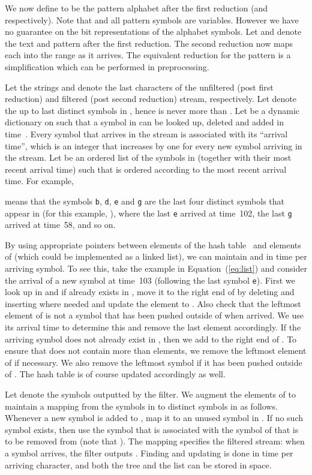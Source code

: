 \documentclass[11pt,a4paper]{article}
\theoremstyle{theorem}
\begin{document}
We now define  to be the pattern alphabet after the first reduction (and  respectively). Note that  and all pattern symbols are variables. However we have no guarantee on the bit representations of the alphabet symbols. Let  and  denote the text and pattern after the first reduction. The second reduction now maps each  into the range  as it arrives. The equivalent reduction for the pattern is a simplification which can be performed in preprocessing.

Let the strings  and  denote the last  characters of the unfiltered (post first reduction) and filtered (post second reduction) stream, respectively. Let  denote the up to  last distinct symbols in , hence  is never more than . Let  be a dynamic dictionary on  such that a symbol in  can be looked up, deleted and added in  time~\cite{AT:2000}. Every symbol that arrives in the stream is associated with its ``arrival time'', which is an integer that increases by one for every new symbol arriving in the stream. Let  be an ordered list of the symbols in  (together with their most recent arrival time) such that  is ordered according to the most recent arrival time. For example,

means that the symbols \texttt{b}, \texttt{d}, \texttt{e} and \texttt{g} are the last four distinct symbols that appear in  (for this example, ), where the last \texttt{e} arrived at time~102, the last \texttt{g} arrived at time~58, and so on.

    By using appropriate pointers between elements of the hash table~ and elements of  (which could be implemented as a linked list), we can maintain  and  in  time per arriving symbol. To see this, take the example in Equation~(\ref{eq:list}) and consider the arrival of a new symbol  at time~103 (following the last symbol \texttt{e}). First we look up  in  and if  already exists in , move it to the right end of  by deleting and inserting where needed and update the element to . Also check that the leftmost element of  is not a symbol that has been pushed outside of  when  arrived. We use its arrival time to determine this and remove the last element accordingly. If the arriving symbol  does not already exist in , then we add  to the right end of . To ensure that  does not contain more than  elements, we remove the leftmost element of  if necessary. We also remove the leftmost symbol if it has been pushed outside of . The hash table  is of course updated accordingly as well.

    Let  denote the symbols outputted by the filter. We augment the elements of  to maintain a mapping  from the symbols in  to distinct symbols in  as follows. Whenever a new symbol is added to , map it to an unused symbol in . If no such symbol exists, then use the symbol that is associated with the symbol of  that is to be removed from  (note that ). The mapping  specifies the filtered stream: when a symbol  arrives, the filter outputs . Finding  and updating  is done in  time per arriving character, and both the tree  and the list  can be stored in  space.
\end{document}

